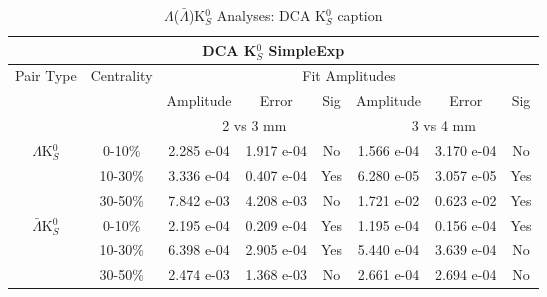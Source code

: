 \documentclass[../AnalysisNoteJBuxton.tex]{subfiles}
\begin{document}
\begin{table}
 \centering
 \begin{tabular}{|c|c|c|c|c||c|c|c|}
  \multicolumn{8}{c}{DCA K$^{0}_{S}$ SimpleExp} \\
  \hline
  \multirow{3}{*}{Pair Type} & \multirow{3}{*}{Centrality} & \multicolumn{6}{c|}{Fit Amplitudes} \\
  \cline{3-8}
   & & Amplitude & Error & Sig & Amplitude & Error & Sig \\  
  \cline{3-8}
   & & \multicolumn{3}{c||}{2 vs 3 mm} & \multicolumn{3}{c|}{3 vs 4 mm} \\  
  \hline  
  \multirow{3}{*}{$\Lambda$K$^{0}_{S}$}  
   &  0-10\% & 2.285 e-04 & 1.917 e-04 & No & 1.566 e-04 & 3.170 e-04 & No \\
   & 10-30\% & 3.336 e-04 & 0.407 e-04 & Yes & 6.280 e-05 & 3.057 e-05 & Yes \\
   & 30-50\% & 7.842 e-03 & 4.208 e-03 & No & 1.721 e-02 & 0.623 e-02 & Yes \\
  \hline  
  \multirow{3}{*}{$\bar{\Lambda}$K$^{0}_{S}$}  
   &  0-10\% & 2.195 e-04 & 0.209 e-04 & Yes & 1.195 e-04 & 0.156 e-04 & Yes \\
   & 10-30\% & 6.398 e-04 & 2.905 e-04 & Yes & 5.440 e-04 & 3.639 e-04 & No \\
   & 30-50\% & 2.474 e-03 & 1.368 e-03 & No & 2.661 e-04 & 2.694 e-04 & No \\
  \hline
 \end{tabular}
 \caption{$\Lambda$($\bar{\Lambda}$)K$^{0}_{S}$ Analyses: DCA K$^{0}_{S}$ caption}
 \label{tab:K0DcaLamK0_SimpleExp}
\end{table}
\end{document}
